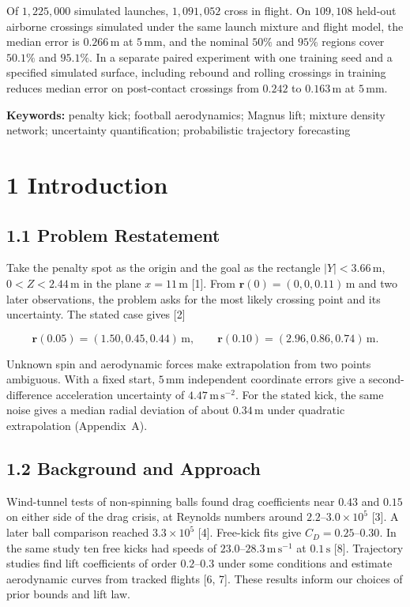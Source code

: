 Of $1{,}225{,}000$ simulated launches, $1{,}091{,}052$ cross in flight. On $109{,}108$ held-out airborne crossings simulated under the same launch mixture and flight model, the median error is $0.266\,\mathrm{m}$ at $5\,\mathrm{mm}$, and the nominal $50\%$ and $95\%$ regions cover $50.1\%$ and $95.1\%$. In a separate paired experiment with one training seed and a specified simulated surface, including rebound and rolling crossings in training reduces median error on post-contact crossings from $0.242$ to $0.163\,\mathrm{m}$ at $5\,\mathrm{mm}$.

\noindent\textbf{Keywords:} penalty kick; football aerodynamics; Magnus lift;
mixture density network; uncertainty quantification; probabilistic trajectory forecasting

\section{1 Introduction}
\subsection{1.1 Problem Restatement}

Take the penalty spot as the origin and the goal as the rectangle $|Y|<3.66\,\mathrm{m}$, $0<Z<2.44\,\mathrm{m}$ in the plane $x=11\,\mathrm{m}$ [1]. From $\mathbf r(0)=(0,0,0.11)\,\mathrm{m}$ and two later observations, the problem asks for the most likely crossing point and its uncertainty. The stated case gives [2]

$$
\mathbf r(0.05)=(1.50,0.45,0.44)\,\mathrm{m},\qquad
  \mathbf r(0.10)=(2.96,0.86,0.74)\,\mathrm{m}.
$$

Unknown spin and aerodynamic forces make extrapolation from two points ambiguous. With a fixed start, $5\,\mathrm{mm}$ independent coordinate errors give a second-difference acceleration uncertainty of $4.47\,\mathrm{m\,s^{-2}}$. For the stated kick, the same noise gives a median radial deviation of about $0.34\,\mathrm{m}$ under quadratic extrapolation (Appendix~A).

\subsection{1.2 Background and Approach}

Wind-tunnel tests of non-spinning balls found drag coefficients near $0.43$ and $0.15$ on either side of the drag crisis, at Reynolds numbers around $2.2$--$3.0\times10^5$ [3]. A later ball comparison reached $3.3\times10^5$ [4]. Free-kick fits give $C_D=0.25$--$0.30$. In the same study ten free kicks had speeds of $23.0$--$28.3\,\mathrm{m\,s^{-1}}$ at $0.1\,\mathrm{s}$ [8]. Trajectory studies find lift coefficients of order $0.2$--$0.3$ under some conditions and estimate aerodynamic curves from tracked flights [6, 7]. These results inform our choices of prior bounds and lift law.

